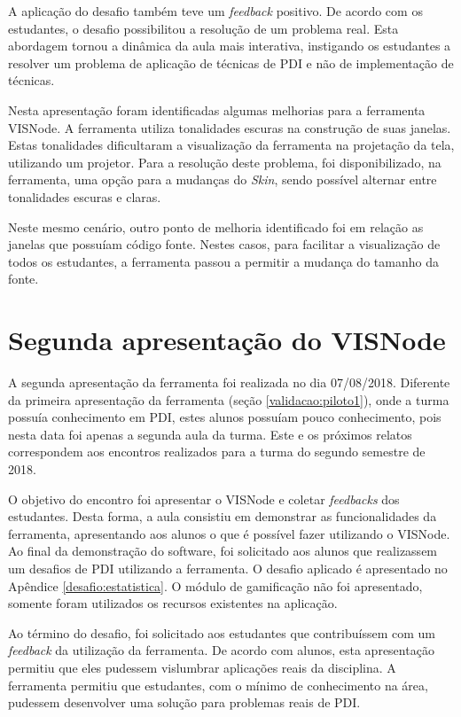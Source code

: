 \documentclass[
	12pt,				%
	oneside,			%
	a4paper,			%
	english,			%
	french,				%
	spanish,			%
	brazil,				%
	]{abntex2}
\begin{document}
A aplicação do desafio também teve um \textit{feedback} positivo. De acordo com os estudantes, o desafio possibilitou a resolução de um problema real. Esta abordagem tornou a dinâmica da aula mais interativa, instigando os estudantes a resolver um problema de aplicação de técnicas de PDI e não de implementação de técnicas.

Nesta apresentação foram identificadas algumas melhorias para a ferramenta VISNode. A ferramenta utiliza tonalidades escuras na construção de suas janelas. Estas tonalidades dificultaram a visualização da ferramenta na projetação da tela, utilizando um projetor. Para a resolução deste problema, foi disponibilizado, na ferramenta, uma opção para a mudanças do \textit{Skin}, sendo possível alternar entre tonalidades escuras e claras.

Neste mesmo cenário, outro ponto de melhoria identificado foi em relação as janelas que possuíam código fonte. Nestes casos, para facilitar a visualização de todos os estudantes, a ferramenta  passou a permitir a mudança do tamanho da fonte. 

\section{Segunda apresentação do VISNode}

A segunda apresentação da ferramenta foi realizada no dia 07/08/2018. Diferente da primeira apresentação da ferramenta (seção \ref{validacao:piloto1}), onde a turma possuía conhecimento em PDI, estes alunos possuíam pouco conhecimento, pois nesta data foi apenas a segunda aula da turma. Este e os próximos relatos correspondem aos encontros realizados para a turma do segundo semestre de 2018.

O objetivo do encontro foi apresentar o VISNode e coletar \textit{feedbacks} dos estudantes. Desta forma, a aula consistiu em demonstrar as funcionalidades da ferramenta, apresentando aos alunos o que é possível fazer utilizando o VISNode. Ao final da demonstração do software, foi solicitado aos alunos que realizassem um desafios de PDI utilizando a ferramenta. O desafio aplicado é apresentado no Apêndice \ref{desafio:estatistica}. O módulo de gamificação não foi apresentado, somente foram utilizados os recursos existentes na aplicação.

Ao término do desafio, foi solicitado aos estudantes que contribuíssem com um \textit{feedback} da utilização da ferramenta. De acordo com alunos, esta apresentação permitiu que eles pudessem vislumbrar aplicações reais da disciplina. A ferramenta permitiu que estudantes, com o mínimo de conhecimento na área, pudessem desenvolver uma solução para problemas reais de PDI.
\end{document}
